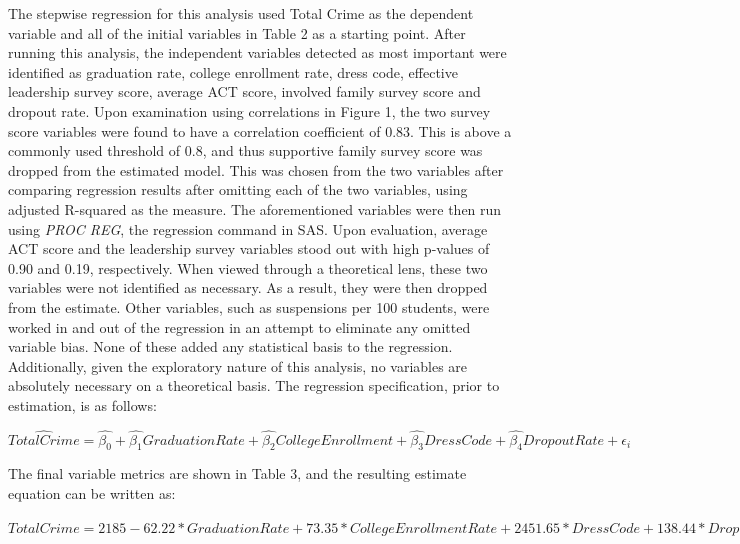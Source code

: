 \documentclass[12pt]{article}
\begin{document}
The stepwise regression for this analysis used Total Crime as the dependent variable and all of the initial variables in Table 2 as a starting point.  After running this analysis, the independent variables detected as most important were identified as graduation rate, college enrollment rate, dress code, effective leadership survey score, average ACT score, involved family survey score and dropout rate.  Upon examination using correlations in Figure 1, the two survey score variables were found to have a correlation coefficient of 0.83.  This is above a commonly used threshold of 0.8, and thus supportive family survey score was dropped from the estimated model.  This was chosen from the two variables after comparing regression results after omitting each of the two variables, using adjusted R-squared as the measure.  The aforementioned variables were then run using \textit{PROC REG}, the regression command in SAS.  Upon evaluation, average ACT score and the leadership survey variables stood out with high p-values of 0.90 and 0.19, respectively.  When viewed through a theoretical lens, these two variables were not identified as necessary.  As a result, they were then dropped from the estimate.  Other variables, such as suspensions per 100 students, were worked in and out of the regression in an attempt to eliminate any omitted variable bias.  None of these added any statistical basis to the regression.  Additionally, given the exploratory nature of this analysis, no variables are absolutely necessary on a theoretical basis.  The regression specification, prior to estimation, is as follows:

\begin{center}
\begin{math}
\hat{TotalCrime} = \hat{\beta_{0}}+\hat{\beta_{1}}GraduationRate+\hat{\beta_{2}}CollegeEnrollment+\hat{\beta_{3}}DressCode+\hat{\beta_{4}}DropoutRate+\epsilon_{i}
\end{math}
\end{center}

The final variable metrics are shown in Table 3, and the resulting estimate equation can be written as: \\

\begin{center}
\begin{math}
TotalCrime = 2185 - 62.22*GraduationRate + 73.35*CollegeEnrollmentRate + 2451.65*DressCode + 138.44*DropoutRate
\end{math}
\end{center}
\end{document}
